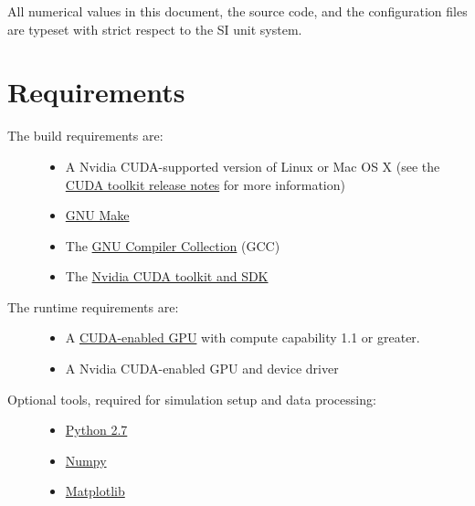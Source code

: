 \documentclass[letterpaper,10pt,english]{sphinxmanual}
\begin{document}
All numerical values in this document, the source code, and the configuration files are typeset with strict respect to the SI unit system.


\section{Requirements}
\label{introduction:requirements}\begin{description}
\item[{The build requirements are:}] \leavevmode\begin{itemize}
\item {} 
A Nvidia CUDA-supported version of Linux or Mac OS X (see the \href{http://docs.nvidia.com/cuda/cuda-toolkit-release-notes/index.html}{CUDA toolkit release notes} for more information)

\item {} 
\href{https://www.gnu.org/software/make/}{GNU Make}

\item {} 
The \href{http://gcc.gnu.org/}{GNU Compiler Collection} (GCC)

\item {} 
The \href{https://developer.nvidia.com/cuda-downloads}{Nvidia CUDA toolkit and SDK}

\end{itemize}

\item[{The runtime requirements are:}] \leavevmode\begin{itemize}
\item {} 
A \href{http://www.nvidia.com/object/cuda\_gpus.html}{CUDA-enabled GPU} with compute capability 1.1 or greater.

\item {} 
A Nvidia CUDA-enabled GPU and device driver

\end{itemize}

\item[{Optional tools, required for simulation setup and data processing:}] \leavevmode\begin{itemize}
\item {} 
\href{http://www.python.org/getit/releases/2.7/}{Python 2.7}

\item {} 
\href{http://numpy.scipy.org}{Numpy}

\item {} 
\href{http://matplotlib.org}{Matplotlib}


\end{itemize}
\end{description}
\end{document}
